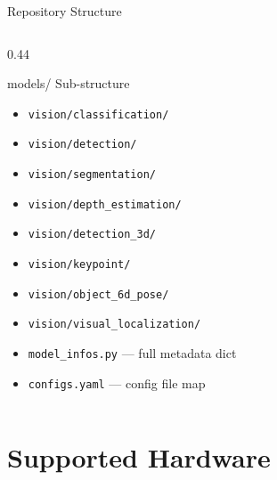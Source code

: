 \documentclass[aspectratio=169,12pt]{beamer}
\begin{document}
\begin{frame}{Repository Structure}
\begin{columns}[T]
\begin{column}{0.44\textwidth}
      \vspace{0.3cm}
      \begin{exampleblock}{models/ Sub-structure}
        \begin{itemize}\scriptsize
          \item \texttt{vision/classification/}
          \item \texttt{vision/detection/}
          \item \texttt{vision/segmentation/}
          \item \texttt{vision/depth\_estimation/}
          \item \texttt{vision/detection\_3d/}
          \item \texttt{vision/keypoint/}
          \item \texttt{vision/object\_6d\_pose/}
          \item \texttt{vision/visual\_localization/}
          \item \texttt{model\_infos.py} — full metadata dict
          \item \texttt{configs.yaml} — config file map
        \end{itemize}
      \end{exampleblock}
    \end{column}
  \end{columns}
\end{frame}

\section{Supported Hardware}
\end{document}
